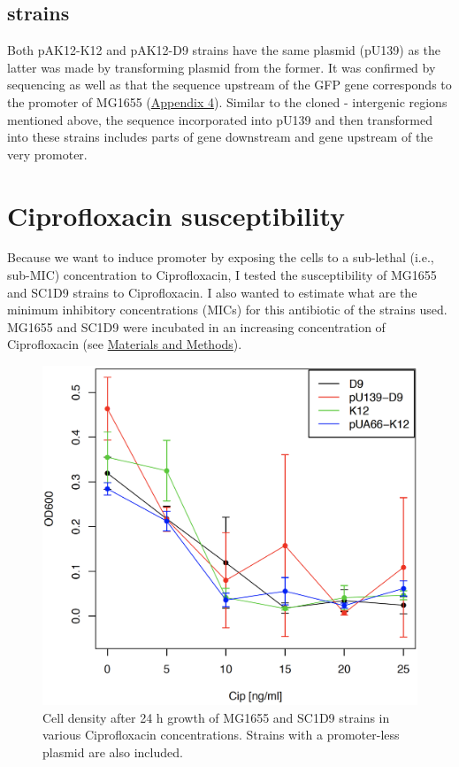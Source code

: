 \subsection{ strains}
Both pA\textunderscore K12-K12 and pA\textunderscore K12-D9 strains have the same plasmid (pU139) as the latter was made by transforming plasmid from the former.
It was confirmed by sequencing as well as that the sequence upstream of the GFP gene corresponds to the  promoter of MG1655 (\hyperlink{precAalign}{Appendix 4}).
Similar to the cloned - intergenic regions mentioned above, the sequence incorporated into pU139 and then transformed into these  strains includes parts of  gene downstream and  gene upstream of the very promoter.


\section{Ciprofloxacin susceptibility}
Because we want to induce  promoter by exposing the cells to a sub-lethal (i.e., sub-MIC) concentration to Ciprofloxacin, I tested the susceptibility of MG1655 and SC1\textunderscore D9 strains to Ciprofloxacin.
I also wanted to estimate what are the minimum inhibitory concentrations (MICs) for this antibiotic of the strains used.
MG1655 and SC1\textunderscore D9 were incubated in an increasing concentration of Ciprofloxacin (see \hyperlink{MIC}{Materials and Methods}).
\begin{figure}[b!]
  \centering
  \includegraphics[scale=0.25]{text/Pictures/KillCurve.png}
    \caption{Cell density after 24 h growth of MG1655 and SC1\textunderscore D9 strains in various Ciprofloxacin concentrations. Strains with a promoter-less plasmid are also included.}
    \label{killing}
\end{figure}
